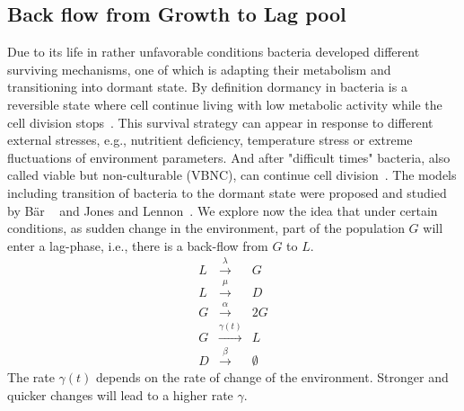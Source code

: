 \documentclass[10pt,A4paper]{article}
\begin{document}
\subsection{Back flow from Growth to Lag pool}
Due to its life in rather unfavorable conditions bacteria developed different surviving mechanisms, one of which is adapting their metabolism and transitioning into dormant state.
By definition dormancy in bacteria is a reversible state where cell continue living with low metabolic activity while the cell division stops~\cite{kaprelyants_dormancy_1993}. 
This survival strategy can appear in response to different external stresses, e.g., nutritient deficiency, temperature stress or extreme fluctuations of environment parameters.
And after "difficult times" bacteria, also called viable but non-culturable (VBNC), can continue cell division~\cite{kell_viability_1998}.
The models including transition of bacteria to the dormant state were proposed and studied by Bär \etal~\cite{bar_modelling_2002} and Jones and Lennon~\cite{jones_dormancy_2010}.
%
%
We explore now the idea that under certain conditions, as sudden change in the environment, part of the population $G$ will enter a lag-phase, i.e., there is a back-flow from $G$ to $L$. 
\begin{eqnarray}
    L &\stackrel{\lambda}{\longrightarrow} & G\\
    L &\stackrel{\mu}{\longrightarrow} & D\\
    G &\stackrel{\alpha}{\longrightarrow} & 2G\\
    G &\stackrel{\gamma(t)}{\longrightarrow} & L\\
    D &\stackrel{\beta}{\longrightarrow} & \emptyset
\end{eqnarray}
The rate $\gamma(t)$ depends on the rate of change of the environment.
Stronger and quicker changes will lead to a higher rate $\gamma$. 
%
%
\end{document}
